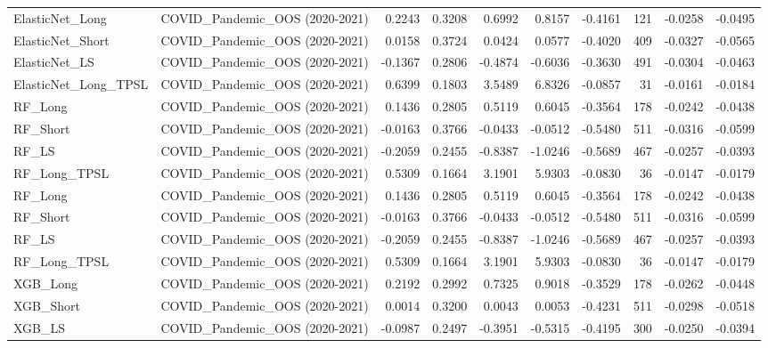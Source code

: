 \begin{tabular}{llrrrrrrrr}
\cline{1-10}
ElasticNet\_Long & COVID\_Pandemic\_OOS (2020-2021) & 0.2243 & 0.3208 & 0.6992 & 0.8157 & -0.4161 & 121 & -0.0258 & -0.0495 \\
\cline{1-10}
ElasticNet\_Short & COVID\_Pandemic\_OOS (2020-2021) & 0.0158 & 0.3724 & 0.0424 & 0.0577 & -0.4020 & 409 & -0.0327 & -0.0565 \\
\cline{1-10}
ElasticNet\_LS & COVID\_Pandemic\_OOS (2020-2021) & -0.1367 & 0.2806 & -0.4874 & -0.6036 & -0.3630 & 491 & -0.0304 & -0.0463 \\
\cline{1-10}
ElasticNet\_Long\_TPSL & COVID\_Pandemic\_OOS (2020-2021) & 0.6399 & 0.1803 & 3.5489 & 6.8326 & -0.0857 & 31 & -0.0161 & -0.0184 \\
\cline{1-10}
RF\_Long & COVID\_Pandemic\_OOS (2020-2021) & 0.1436 & 0.2805 & 0.5119 & 0.6045 & -0.3564 & 178 & -0.0242 & -0.0438 \\
\cline{1-10}
RF\_Short & COVID\_Pandemic\_OOS (2020-2021) & -0.0163 & 0.3766 & -0.0433 & -0.0512 & -0.5480 & 511 & -0.0316 & -0.0599 \\
\cline{1-10}
RF\_LS & COVID\_Pandemic\_OOS (2020-2021) & -0.2059 & 0.2455 & -0.8387 & -1.0246 & -0.5689 & 467 & -0.0257 & -0.0393 \\
\cline{1-10}
RF\_Long\_TPSL & COVID\_Pandemic\_OOS (2020-2021) & 0.5309 & 0.1664 & 3.1901 & 5.9303 & -0.0830 & 36 & -0.0147 & -0.0179 \\
\cline{1-10}
RF\_Long & COVID\_Pandemic\_OOS (2020-2021) & 0.1436 & 0.2805 & 0.5119 & 0.6045 & -0.3564 & 178 & -0.0242 & -0.0438 \\
\cline{1-10}
RF\_Short & COVID\_Pandemic\_OOS (2020-2021) & -0.0163 & 0.3766 & -0.0433 & -0.0512 & -0.5480 & 511 & -0.0316 & -0.0599 \\
\cline{1-10}
RF\_LS & COVID\_Pandemic\_OOS (2020-2021) & -0.2059 & 0.2455 & -0.8387 & -1.0246 & -0.5689 & 467 & -0.0257 & -0.0393 \\
\cline{1-10}
RF\_Long\_TPSL & COVID\_Pandemic\_OOS (2020-2021) & 0.5309 & 0.1664 & 3.1901 & 5.9303 & -0.0830 & 36 & -0.0147 & -0.0179 \\
\cline{1-10}
XGB\_Long & COVID\_Pandemic\_OOS (2020-2021) & 0.2192 & 0.2992 & 0.7325 & 0.9018 & -0.3529 & 178 & -0.0262 & -0.0448 \\
\cline{1-10}
XGB\_Short & COVID\_Pandemic\_OOS (2020-2021) & 0.0014 & 0.3200 & 0.0043 & 0.0053 & -0.4231 & 511 & -0.0298 & -0.0518 \\
\cline{1-10}
XGB\_LS & COVID\_Pandemic\_OOS (2020-2021) & -0.0987 & 0.2497 & -0.3951 & -0.5315 & -0.4195 & 300 & -0.0250 & -0.0394 \\

\end{tabular}
